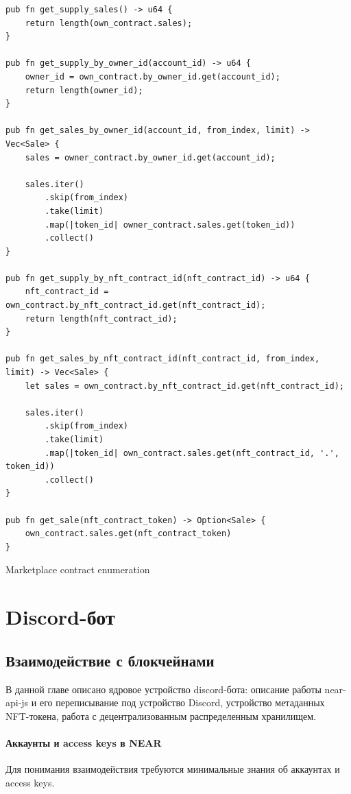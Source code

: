 \begin{listing}
\begin{verbatim}
pub fn get_supply_sales() -> u64 {
    return length(own_contract.sales);
}

pub fn get_supply_by_owner_id(account_id) -> u64 {
    owner_id = own_contract.by_owner_id.get(account_id);
    return length(owner_id);
}

pub fn get_sales_by_owner_id(account_id, from_index, limit) -> Vec<Sale> {
    sales = owner_contract.by_owner_id.get(account_id);

    sales.iter()
        .skip(from_index)
        .take(limit)
        .map(|token_id| owner_contract.sales.get(token_id))
        .collect()
}

pub fn get_supply_by_nft_contract_id(nft_contract_id) -> u64 {
    nft_contract_id = own_contract.by_nft_contract_id.get(nft_contract_id);
    return length(nft_contract_id);
}

pub fn get_sales_by_nft_contract_id(nft_contract_id, from_index, limit) -> Vec<Sale> {
    let sales = own_contract.by_nft_contract_id.get(nft_contract_id);

    sales.iter()
        .skip(from_index)
        .take(limit)
        .map(|token_id| own_contract.sales.get(nft_contract_id, '.', token_id))
        .collect()
}

pub fn get_sale(nft_contract_token) -> Option<Sale> {
    own_contract.sales.get(nft_contract_token)
}
\end{verbatim}
\caption{Marketplace contract enumeration}
\label{marketplacecontract.enumeration}
\end{listing}

\section{Discord-бот}
\label{section.main.bot}

\subsection{Взаимодействие с блокчейнами}

В данной главе описано ядровое устройство discord-бота: описание работы near-api-js и его переписывание под устройство Discord, устройство метаданных NFT-токена, работа с децентрализованным распределенным хранилищем.

\paragraph{Аккаунты и access keys в NEAR}
Для понимания взаимодействия требуются минимальные знания об аккаунтах и access keys.

